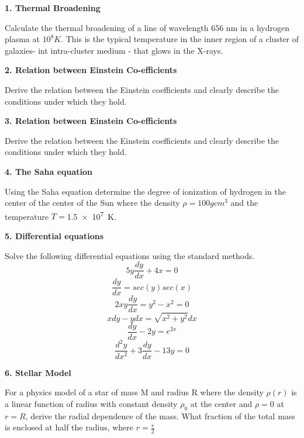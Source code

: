 \documentclass{article}
\begin{document}
	\textbf{1. Thermal Broadening}
	
		Calculate the thermal broadening of a line of wavelength 656 nm in  a hydrogen plasma at $10^8 K$. This is the typical temperature in the inner region of a cluster of galaxies- int intra-cluster medium - that glows in the X-rays. 
	
    \textbf{2. Relation between Einstein Co-efficients}

		Derive the relation between the Einstein coefficients and clearly describe the conditions under which they hold.
	

	
	\textbf{3. Relation between Einstein Co-efficients}
		
		Derive the relation between the Einstein coefficients and clearly describe the conditions under which they hold.
	

	
	\textbf{4. The Saha equation}

		Using the Saha equation determine the degree of ionization of hydrogen in the center of the center of the Sun where the density $\rho = 100 g cm^3$ and the temperature $T=$\SI{1.5e7}{\kelvin}. 
	

	
	\textbf{5. Differential equations}

		Solve the following differential equations using the standard methods.
		\begin{equation}
			5y\frac{dy}{dx} +4x =0
		\end{equation}
		\begin{equation}
			\frac{dy}{dx}= sec(y)sec(x)
		\end{equation}
		\begin{equation}
			2xy\frac{dy}{dx} =y^{2}-x^{2} =0
		\end{equation}
		\begin{equation}
			xdy-ydx=\sqrt{x^{2}+y^{2}} dx
		\end{equation}
		\begin{equation}
			\frac{dy}{dx} -2y =e^{2x}
		\end{equation}
		\begin{equation}
			\frac{d^2y}{dx^2} +3\frac{dy}{dx} - 13y =0
		\end{equation}

	

	
	\textbf{6. Stellar Model}

		For a physics model of a star of mass M and radius R where the density $\rho(r)$ is a linear function of radius with constant density $\rho_{0}$ at the center and $\rho=0$ at $r=R$, derive the radial dependence of the mass. What fraction of the total mass is enclosed at half the radius, where $r=\frac{r}{2}$
	
\end{document}
